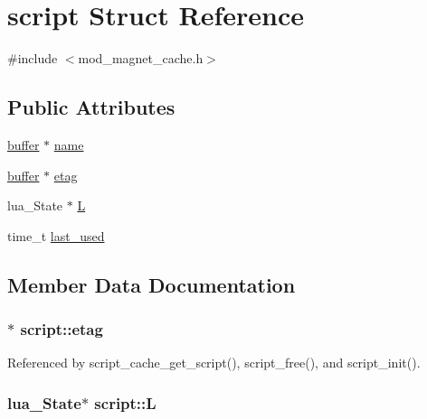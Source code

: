 \hypertarget{structscript}{\section{script Struct Reference}
\label{structscript}
}


{\ttfamily \#include $<$mod\-\_\-magnet\-\_\-cache.\-h$>$}

\subsection*{Public Attributes}
\begin{DoxyCompactItemize}
\item 
\hyperlink{structbuffer}{buffer} $\ast$ \hyperlink{structscript_a7ab3fb09fddf822a555ee21ff11e937a}{name}
\item 
\hyperlink{structbuffer}{buffer} $\ast$ \hyperlink{structscript_aa178807162a46127af87b9c1707a5e5a}{etag}
\item 
lua\-\_\-\-State $\ast$ \hyperlink{structscript_a9ef9610294f061d5b792b7540f5f7924}{L}
\item 
time\-\_\-t \hyperlink{structscript_adad5b6320024766da6837691025d547d}{last\-\_\-used}
\end{DoxyCompactItemize}


\subsection{Member Data Documentation}
\hypertarget{structscript_aa178807162a46127af87b9c1707a5e5a}{
\subsubsection[{etag}]{$\ast$ script\-::etag}}\label{structscript_aa178807162a46127af87b9c1707a5e5a}


Referenced by script\-\_\-cache\-\_\-get\-\_\-script(), script\-\_\-free(), and script\-\_\-init().

\hypertarget{structscript_a9ef9610294f061d5b792b7540f5f7924}{
\subsubsection[{L}]{\setlength{\rightskip}{0pt plus 5cm}lua\-\_\-\-State$\ast$ script\-::\-L}}\label{structscript_a9ef9610294f061d5b792b7540f5f7924}


